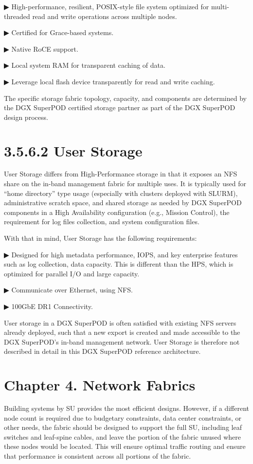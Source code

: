 \documentclass[
  10
]{article}
\begin{document}
▶ High-performance, resilient, POSIX-style file system optimized for
multi-threaded read and write operations across multiple nodes.

▶ Certified for Grace-based systems.

▶ Native RoCE support.

▶ Local system RAM for transparent caching of data.

▶ Leverage local flash device transparently for read and write caching.

The specific storage fabric topology, capacity, and components are
determined by the DGX SuperPOD certified storage partner as part of the
DGX SuperPOD design process.

\section{3.5.6.2 User Storage}\label{user-storage}

User Storage differs from High-Performance storage in that it exposes an
NFS share on the in-band management fabric for multiple uses. It is
typically used for ``home directory'' type usage (especially with
clusters deployed with SLURM), administrative scratch space, and shared
storage as needed by DGX SuperPOD components in a High Availability
configuration (e.g., Mission Control), the requirement for log files
collection, and system configuration files.

With that in mind, User Storage has the following requirements:

▶ Designed for high metadata performance, IOPS, and key enterprise
features such as log collection, data capacity. This is different than
the HPS, which is optimized for parallel I/O and large capacity.

▶ Communicate over Ethernet, using NFS.

▶ 100GbE DR1 Connectivity.

User storage in a DGX SuperPOD is often satisfied with existing NFS
servers already deployed, such that a new export is created and made
accessible to the DGX SuperPOD's in-band management network. User
Storage is therefore not described in detail in this DGX SuperPOD
reference architecture.

\section{Chapter 4. Network Fabrics}\label{chapter-4.-network-fabrics}

Building systems by SU provides the most efficient designs. However, if
a different node count is required due to budgetary constraints, data
center constraints, or other needs, the fabric should be designed to
support the full SU, including leaf switches and leaf-spine cables, and
leave the portion of the fabric unused where these nodes would be
located. This will ensure optimal traffic routing and ensure that
performance is consistent across all portions of the fabric.
\end{document}
